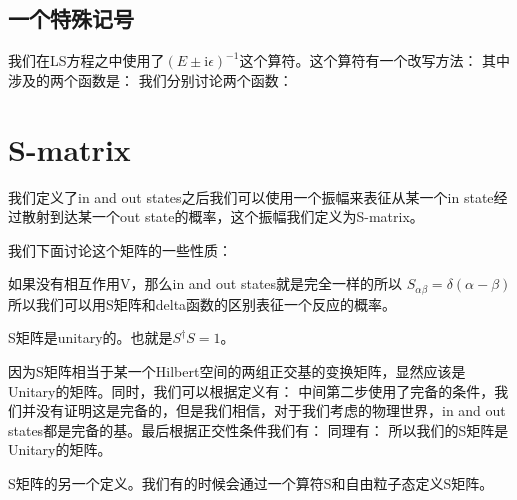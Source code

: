 \subsection{一个特殊记号}

我们在LS方程之中使用了$ (E \pm \mathrm{i} \epsilon)^{-1} $这个算符。这个算符有一个改写方法：
其中涉及的两个函数是：
我们分别讨论两个函数：

\section{S-matrix}
我们定义了in and out states之后我们可以使用一个振幅来表征从某一个in state经过散射到达某一个out state的概率，这个振幅我们定义为S-matrix。

我们下面讨论这个矩阵的一些性质：
\bigskip

如果没有相互作用V，那么in and out states就是完全一样的所以 $ S_{\alpha\beta} = \delta(\alpha-\beta) $ 所以我们可以用S矩阵和delta函数的区别表征一个反应的概率。

\bigskip

 S矩阵是unitary的。也就是$ S^\dagger S = 1 $。

因为S矩阵相当于某一个Hilbert空间的两组正交基的变换矩阵，显然应该是Unitary的矩阵。同时，我们可以根据定义有：
中间第二步使用了完备的条件，我们并没有证明这是完备的，但是我们相信，对于我们考虑的物理世界，in and out states都是完备的基。最后根据正交性条件我们有：
同理有：
所以我们的S矩阵是Unitary的矩阵。
\bigskip

 S矩阵的另一个定义。我们有的时候会通过一个算符S和自由粒子态定义S矩阵。
